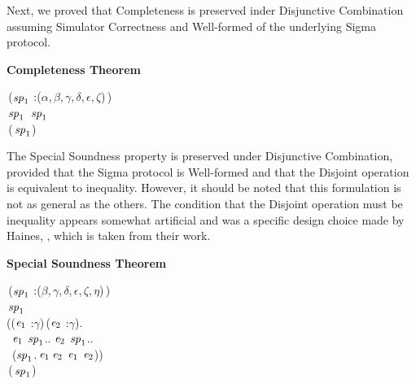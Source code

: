 Next, we proved that Completeness is preserved inder Disjunctive Combination assuming Simulator Correctness and Well-formed of the underlying Sigma protocol. 

\textbf{Completeness Theorem}\\
\begin{holmath}
    \,(\ensuremath{\HOLFreeVar{sp}\sb{\mathrm{1}}} :(\ensuremath{\alpha},\,\ensuremath{\beta},\,\ensuremath{\gamma},\,\ensuremath{\delta},\,\ensuremath{\epsilon},\,\ensuremath{\zeta})\,)\,\HOLSymConst{\HOLTokenConj{}}\\
\,\ensuremath{\HOLFreeVar{sp}\sb{\mathrm{1}}}\,\HOLSymConst{\HOLTokenConj{}}\,\,\ensuremath{\HOLFreeVar{sp}\sb{\mathrm{1}}}\,\HOLSymConst{\HOLTokenImp{}}\\
\,(\,\ensuremath{\HOLFreeVar{sp}\sb{\mathrm{1}}})
\end{holmath}  

The Special Soundness property is preserved under Disjunctive Combination, provided that the Sigma protocol is Well-formed and that the Disjoint operation is equivalent to inequality. However, it should be noted that this formulation is not as general as the others. The condition that the Disjoint operation must be inequality appears somewhat artificial and was a specific design choice made by Haines, \cite{Haines2019VerifiedVF}, which is taken from their work.

\textbf{Special Soundness Theorem}
\begin{holmath}
    \,(\ensuremath{\HOLFreeVar{sp}\sb{\mathrm{1}}} :(\ensuremath{\beta},\,\ensuremath{\gamma},\,\ensuremath{\delta},\,\ensuremath{\epsilon},\,\ensuremath{\zeta},\,\ensuremath{\eta})\,)\,\HOLSymConst{\HOLTokenConj{}}\\
\,\ensuremath{\HOLFreeVar{sp}\sb{\mathrm{1}}}\,\HOLSymConst{\HOLTokenConj{}}\\
(\HOLSymConst{\HOLTokenForall{}}(\ensuremath{\HOLBoundVar{e}\sb{\mathrm{1}}} :\ensuremath{\gamma})\,(\ensuremath{\HOLBoundVar{e}\sb{\mathrm{2}}} :\ensuremath{\gamma}).\\
\,\,\,\ensuremath{\HOLBoundVar{e}\sb{\mathrm{1}}}\,\HOLSymConst{\HOLTokenIn{}}\,\ensuremath{\HOLFreeVar{sp}\sb{\mathrm{1}}}..\,\HOLSymConst{\HOLTokenConj{}}\,\ensuremath{\HOLBoundVar{e}\sb{\mathrm{2}}}\,\HOLSymConst{\HOLTokenIn{}}\,\ensuremath{\HOLFreeVar{sp}\sb{\mathrm{1}}}..\,\HOLSymConst{\HOLTokenImp{}}\\
\,\,\,(\ensuremath{\HOLFreeVar{sp}\sb{\mathrm{1}}}.\,\ensuremath{\HOLBoundVar{e}\sb{\mathrm{1}}}\,\ensuremath{\HOLBoundVar{e}\sb{\mathrm{2}}}\,\HOLSymConst{\HOLTokenEquiv{}}\,\ensuremath{\HOLBoundVar{e}\sb{\mathrm{1}}}\,\HOLSymConst{\HOLTokenNotEqual{}}\,\ensuremath{\HOLBoundVar{e}\sb{\mathrm{2}}}))\,\HOLSymConst{\HOLTokenImp{}}\\
\,(\,\ensuremath{\HOLFreeVar{sp}\sb{\mathrm{1}}})
\end{holmath}  

